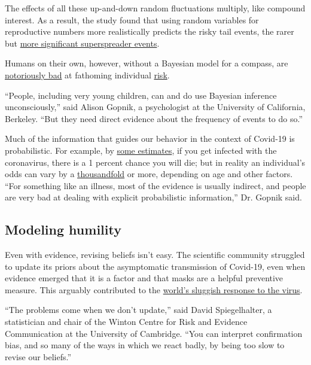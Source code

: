 The effects of all these up-and-down random fluctuations multiply, like
compound interest. As a result, the study found that using random
variables for reproductive numbers more realistically predicts the risky
tail events, the rarer but
\href{https://www.nytimes.com/2020/06/30/science/how-coronavirus-spreads.html}{more
significant superspreader events}.

Humans on their own, however, without a Bayesian model for a compass,
are \href{https://en.wikipedia.org/wiki/Prospect_theory}{notoriously
bad} at fathoming individual
\href{https://twitter.com/xkcdComic/status/1283437923421937666/photo/1}{risk}.

``People, including very young children, can and do use Bayesian
inference unconsciously,'' said Alison Gopnik, a psychologist at the
University of California, Berkeley. ``But they need direct evidence
about the frequency of events to do so.''

Much of the information that guides our behavior in the context of
Covid-19 is probabilistic. For example, by
\href{https://www.nature.com/articles/d41586-020-01738-2}{some
estimates}, if you get infected with the coronavirus, there is a 1
percent chance you will die; but in reality an individual's odds can
vary by a
\href{https://medium.com/wintoncentre/how-much-normal-risk-does-covid-represent-4539118e1196}{thousandfold}
or more, depending on age and other factors. ``For something like an
illness, most of the evidence is usually indirect, and people are very
bad at dealing with explicit probabilistic information,'' Dr. Gopnik
said.

\hypertarget{modeling-humility}{%
\subsection{Modeling humility}\label{modeling-humility}}

Even with evidence, revising beliefs isn't easy. The scientific
community struggled to update its priors about the asymptomatic
transmission of Covid-19, even when evidence emerged that it is a factor
and that masks are a helpful preventive measure. This arguably
contributed to the
\href{https://www.nytimes.com/2020/06/27/world/europe/coronavirus-spread-asymptomatic.html?action=click\&module=RelatedLinks\&pgtype=Article}{world's
sluggish response to the virus}.

``The problems come when we don't update,'' said David Spiegelhalter, a
statistician and chair of the Winton Centre for Risk and Evidence
Communication at the University of Cambridge. ``You can interpret
confirmation bias, and so many of the ways in which we react badly, by
being too slow to revise our beliefs.''

